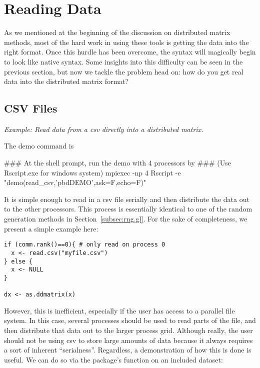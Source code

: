 \chapter{Reading Data}
\label{sec:reader}

As we mentioned at the beginning of the discussion on distributed matrix methods, most of the hard work in using these tools is getting the data into the right format.  Once this hurdle has been overcome, the syntax will magically begin to look like native  syntax.  Some insights into this difficulty can be seen in the previous section, but now we tackle the problem head on:  how do you get real data into the distributed matrix format?

\section{CSV Files}
\label{sec:csv_files}

\emph{Example:  Read data from a csv directly into a distributed matrix.}

The demo command is
\begin{Command}
### At the shell prompt, run the demo with 4 processors by
### (Use Rscript.exe for windows system)
mpiexec -np 4 Rscript -e "demo(read_csv,'pbdDEMO',ask=F,echo=F)"
\end{Command}

It is simple enough to read in a csv file serially and then distribute the data out to the other processors.  This process is essentially identical to one of the random generation methods in Section~\ref{subsec:rng.gl}.  For the sake of completeness, we present a simple example here:

\begin{lstlisting}[language=rr]
if (comm.rank()==0){ # only read on process 0
  x <- read.csv("myfile.csv")
} else {
  x <- NULL
}

dx <- as.ddmatrix(x)
\end{lstlisting}

However, this is inefficient, especially if the user has access to a parallel file system.  In this case, several processes should be used to read parts of the file, and then distribute that data out to the larger process grid.  Although really, the user should not be using csv to store large amounts of data because it always requires a sort of inherent ``serialness''.  Regardless, a demonstration of how this is done is useful.  We can do so via the  package's function  on an included dataset:

